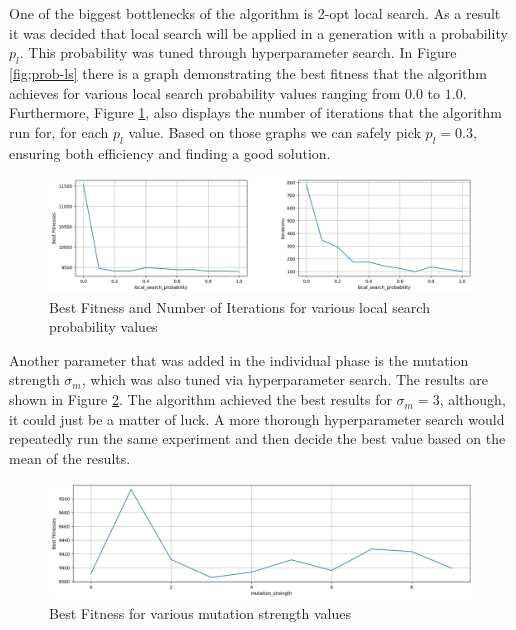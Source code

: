 \documentclass[a4paper,10pt]{article}
\begin{document}
One of the biggest bottlenecks of the algorithm is 2-opt local search. As a result it was decided that local search will be applied in a generation with a probability $p_l$. This probability was tuned through  hyperparameter search. In Figure \ref{fig;prob-ls} there is a graph demonstrating the best fitness that the algorithm achieves for various local search probability values ranging from $0.0$ to $1.0$. Furthermore, Figure \ref{fig:prob-ls}, also displays the number of iterations that the algorithm run for, for each $p_l$ value. Based on those graphs we can safely pick $p_l = 0.3$, ensuring both efficiency and finding a good solution. 

\begin{figure}[H]
    \centering
	\includegraphics[width=\textwidth]{results/tuning/prob_LS.png}
    \caption{Best Fitness and Number of Iterations for various local search probability values}
    \label{fig:prob-ls}
\end{figure}

Another parameter that was added in the individual phase is the mutation strength $\sigma_m$, which was also tuned via hyperparameter search. The results are shown in Figure \ref{fig:sigma-mu}. The algorithm achieved the best results for $\sigma_m = 3$, although, it could just be a matter of luck. A more thorough hyperparameter search would repeatedly run the same experiment and then decide the best value based on the mean of the results. 

\begin{figure}[H]
    \centering
	\includegraphics[width=\textwidth]{results/tuning/sigma_mu.png}
    \caption{Best Fitness for various mutation strength values}
    \label{fig:sigma-mu}
\end{figure}
\end{document}
